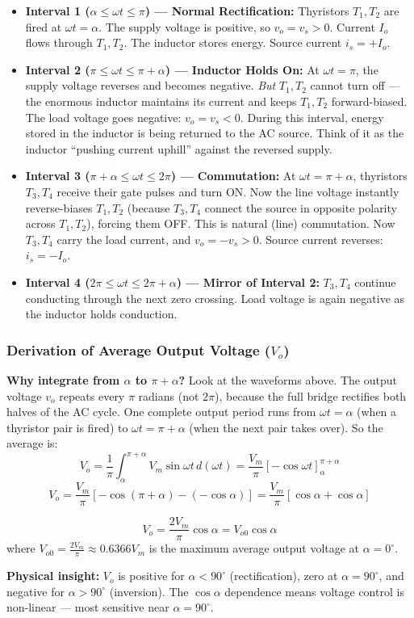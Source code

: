 \documentclass[11pt,a4paper]{article}
\renewcommand{\boxed}[1]{#1}
\begin{document}
\begin{itemize}[leftmargin=*]
  \item \textbf{Interval 1 ($\alpha \le \omega t \le \pi$) --- Normal Rectification:} Thyristors $T_1, T_2$ are fired at $\omega t = \alpha$. The supply voltage is positive, so $v_o = v_s > 0$. Current $I_o$ flows through $T_1, T_2$. The inductor stores energy. Source current $i_s = +I_o$.
  \item \textbf{Interval 2 ($\pi \le \omega t \le \pi+\alpha$) --- Inductor Holds On:} At $\omega t = \pi$, the supply voltage reverses and becomes negative. \textit{But} $T_1, T_2$ cannot turn off --- the enormous inductor maintains its current and keeps $T_1, T_2$ forward-biased. The load voltage goes negative: $v_o = v_s < 0$. During this interval, energy stored in the inductor is being returned to the AC source. Think of it as the inductor ``pushing current uphill'' against the reversed supply.
  \item \textbf{Interval 3 ($\pi+\alpha \le \omega t \le 2\pi$) --- Commutation:} At $\omega t = \pi+\alpha$, thyristors $T_3, T_4$ receive their gate pulses and turn ON. Now the line voltage instantly reverse-biases $T_1, T_2$ (because $T_3, T_4$ connect the source in opposite polarity across $T_1, T_2$), forcing them OFF. This is natural (line) commutation. Now $T_3, T_4$ carry the load current, and $v_o = -v_s > 0$. Source current reverses: $i_s = -I_o$.
  \item \textbf{Interval 4 ($2\pi \le \omega t \le 2\pi+\alpha$) --- Mirror of Interval 2:} $T_3, T_4$ continue conducting through the next zero crossing. Load voltage is again negative as the inductor holds conduction.
\end{itemize}

\subsubsection{Derivation of Average Output Voltage (\texorpdfstring{$V_o$}{Vo})}
\textbf{Why integrate from $\alpha$ to $\pi+\alpha$?} Look at the waveforms above. The output voltage $v_o$ repeats every $\pi$ radians (not $2\pi$), because the full bridge rectifies both halves of the AC cycle. One complete output period runs from $\omega t = \alpha$ (when a thyristor pair is fired) to $\omega t = \pi+\alpha$ (when the next pair takes over). So the average is:
\[
V_o = \frac{1}{\pi} \int_{\alpha}^{\pi+\alpha} V_m \sin\omega t \, d(\omega t) = \frac{V_m}{\pi} [-\cos\omega t]_\alpha^{\pi+\alpha}
\]
\[
V_o = \frac{V_m}{\pi} [-\cos(\pi+\alpha) - (-\cos\alpha)] = \frac{V_m}{\pi} [\cos\alpha + \cos\alpha]
\]
\begin{formulabox}
\[
\boxed{V_o = \frac{2 V_m}{\pi} \cos\alpha = V_{o0} \cos\alpha}
\]
where $V_{o0} = \frac{2 V_m}{\pi} \approx 0.6366 V_m$ is the maximum average output voltage at $\alpha = 0^\circ$.

\textbf{Physical insight:} $V_o$ is positive for $\alpha < 90^\circ$ (rectification), zero at $\alpha = 90^\circ$, and negative for $\alpha > 90^\circ$ (inversion). The $\cos\alpha$ dependence means voltage control is non-linear --- most sensitive near $\alpha = 90^\circ$.
\end{formulabox}
\end{document}
